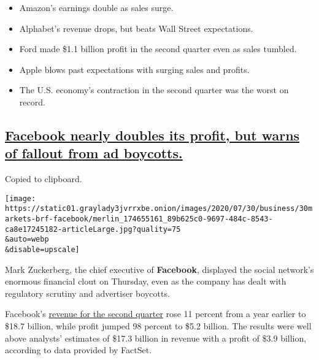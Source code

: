 \begin{itemize}
\item
  \protect\hyperlink{amazons-earnings-double-as-sales-surge}{}

  Amazon's earnings double as sales surge.
\item
  \protect\hyperlink{alphabets-revenue-drops-but-beats-wall-street-expectations}{}

  Alphabet's revenue drops, but beats Wall Street expectations.
\item
  \protect\hyperlink{ford-made-1-1-billion-profit-in-the-second-quarter-even-as-sales-tumbled}{}

  Ford made \$1.1 billion profit in the second quarter even as sales
  tumbled.
\item
  \protect\hyperlink{apple-blows-past-expectations-with-surging-sales-and-profits}{}

  Apple blows past expectations with surging sales and profits.
\item
  \protect\hyperlink{the-us-economys-contraction-in-the-second-quarter-was-the-worst-on-record}{}

  The U.S. economy's contraction in the second quarter was the worst on
  record.
\end{itemize}

\hypertarget{facebook-nearly-doubles-its-profit-but-warns-of-fallout-from-ad-boycotts}{%
\subsection{\texorpdfstring{\protect\hyperlink{facebook-nearly-doubles-its-profit-but-warns-of-fallout-from-ad-boycotts}{Facebook
nearly doubles its profit, but warns of fallout from ad
boycotts.}}{Facebook nearly doubles its profit, but warns of fallout from ad boycotts.}}\label{facebook-nearly-doubles-its-profit-but-warns-of-fallout-from-ad-boycotts}}

Copied to clipboard.

\texttt{[image: https://static01.graylady3jvrrxbe.onion/images/2020/07/30/business/30markets-brf-facebook/merlin\_174655161\_89b625c0-9697-484c-8543-ca8e17245182-articleLarge.jpg?quality=75\\\&auto=webp\\\&disable=upscale]}

Mark Zuckerberg, the chief executive of \textbf{Facebook}, displayed the
social network's enormous financial clout on Thursday, even as the
company has dealt with regulatory scrutiny and advertiser boycotts.

Facebook's
\href{https://investor.fb.com/investor-news/press-release-details/2020/Facebook-Reports-Second-Quarter-2020-Results/default.aspx}{revenue
for the second quarter} rose 11 percent from a year earlier to \$18.7
billion, while profit jumped 98 percent to \$5.2 billion. The results
were well above analysts' estimates of \$17.3 billion in revenue with a
profit of \$3.9 billion, according to data provided by FactSet.

